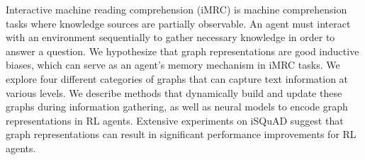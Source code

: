 Interactive machine reading comprehension (iMRC) is machine comprehension tasks where knowledge sources are partially observable. An agent must interact with an environment sequentially to gather necessary knowledge in order to answer a question. We hypothesize that graph representations are good inductive biases, which can serve as an agent's memory mechanism in iMRC tasks. We explore four different categories of graphs that can capture text information at various levels. We describe methods that dynamically build and update these graphs during information gathering, as well as neural models to encode graph representations in RL agents. Extensive experiments on iSQuAD suggest that graph representations can result in significant performance improvements for RL agents.
